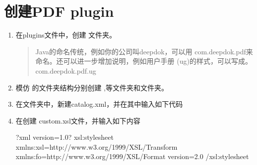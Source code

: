 \documentclass[letterpaper,10pt,english]{sphinxmanual}
\begin{document}
\section{创建PDF plugin}
\label{\detokenize{formatting/dita_plugin-dev:pdf-plugin}}\begin{enumerate}
%
\item {} 
\sphinxAtStartPar
在plugins文件中，创建 文件夹。
\begin{quote}

\sphinxAtStartPar
Java的命名传统，例如你的公司叫deepdok，可以用 com.deepdok.pdf来命名。还可以进一步增加说明，例如用户手册 (ug)的样式，可以写成。com.deepdok.pdf.ug
\end{quote}

\item {} 
\sphinxAtStartPar
模仿 的文件夹结构分别创建  ,等文件夹和文件夹。

\item {} 
\sphinxAtStartPar
在文件夹中，新建catalog.xml，并在其中输入如下代码

\begin{sphinxVerbatim}[commandchars=\\\{\}]
\end{sphinxVerbatim}

\item {} 
\sphinxAtStartPar
在创建 custom.xsl文件，并输入如下内容

\begin{sphinxVerbatim}[commandchars=\\\{\}]
\PYGZlt{}?xml version=\PYGZdq{}1.0\PYGZdq{}?\PYGZgt{}
\PYGZlt{}xsl:stylesheet xmlns:xsl=\PYGZdq{}http://www.w3.org/1999/XSL/Transform\PYGZdq{}
    xmlns:fo=\PYGZdq{}http://www.w3.org/1999/XSL/Format\PYGZdq{}
    version=\PYGZdq{}2.0\PYGZdq{}\PYGZgt{}
\PYGZlt{}/xsl:stylesheet\PYGZgt{}
\end{sphinxVerbatim}


\end{enumerate}
\end{document}

